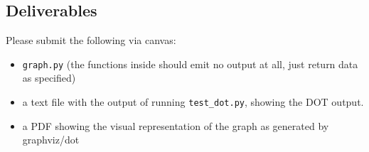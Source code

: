 \begin{fullwidth}
\section{Deliverables}

Please submit the following via canvas:
 
\begin{itemize}
\item {\tt graph.py} (the functions inside should emit no output at all, just return data as specified)
\item a text file with the output of running {\tt test\_dot.py}, showing the DOT output.
\item a PDF showing the visual representation of the graph as generated by graphviz/dot
\end{itemize}

\end{fullwidth}
